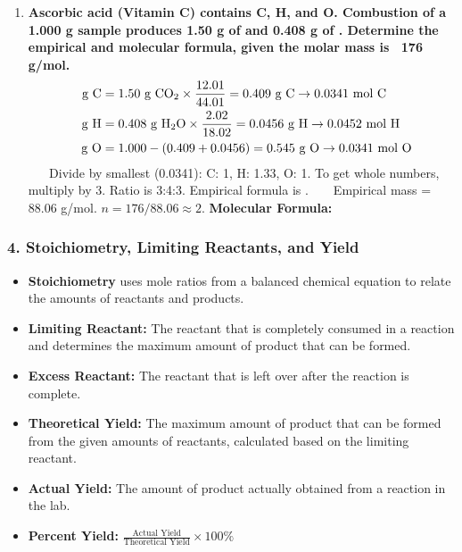 \documentclass{article}
\begin{document}
\begin{enumerate}[itemsep=5pt]
    \item \textbf{Ascorbic acid (Vitamin C) contains C, H, and O. Combustion of a 1.000 g sample produces 1.50 g of  and 0.408 g of . Determine the empirical and molecular formula, given the molar mass is ~176 g/mol.}
    \begin{align*}
        \text{g C} &= 1.50 \text{ g } \ce{CO2} \times \frac{12.01}{44.01} = 0.409 \text{ g C} \rightarrow 0.0341 \text{ mol C} \\
        \text{g H} &= 0.408 \text{ g } \ce{H2O} \times \frac{2.02}{18.02} = 0.0456 \text{ g H} \rightarrow 0.0452 \text{ mol H} \\
        \text{g O} &= 1.000 - (0.409 + 0.0456) = 0.545 \text{ g O} \rightarrow 0.0341 \text{ mol O}
    \end{align*}
    Divide by smallest (0.0341): C: 1, H: 1.33, O: 1. To get whole numbers, multiply by 3. Ratio is 3:4:3. Empirical formula is .
    Empirical mass = 88.06 g/mol. $n = 176 / 88.06 \approx 2$. \textbf{Molecular Formula: }
\end{enumerate}

\bigskip
\subsubsection*{4. Stoichiometry, Limiting Reactants, and Yield}
\begin{itemize}[itemsep=5pt]
    \item \textbf{Stoichiometry} uses mole ratios from a balanced chemical equation to relate the amounts of reactants and products.
    \item \textbf{Limiting Reactant:} The reactant that is completely consumed in a reaction and determines the maximum amount of product that can be formed.
    \item \textbf{Excess Reactant:} The reactant that is left over after the reaction is complete.
    \item \textbf{Theoretical Yield:} The maximum amount of product that can be formed from the given amounts of reactants, calculated based on the limiting reactant.
    \item \textbf{Actual Yield:} The amount of product actually obtained from a reaction in the lab.
    \item \textbf{Percent Yield:} $\frac{\text{Actual Yield}}{\text{Theoretical Yield}} \times 100\%$
\end{itemize}
\end{document}
